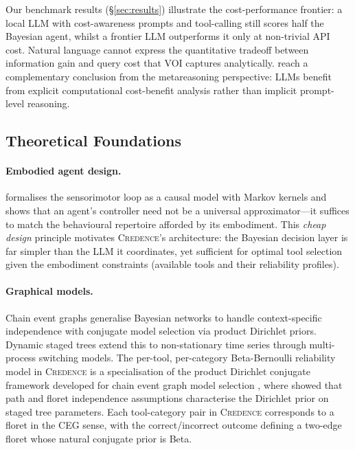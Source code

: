 \documentclass[11pt]{article}
\newcommand{\credence}{\textsc{Credence}}
\begin{document}
Our benchmark results (\S\ref{sec:results}) illustrate the cost-performance frontier: a local LLM with cost-awareness prompts and tool-calling still scores half the Bayesian agent, whilst a frontier LLM outperforms it only at non-trivial API cost. Natural language cannot express the quantitative tradeoff between information gain and query cost that VOI captures analytically. \citet{desabbata2024metareasoning} reach a complementary conclusion from the metareasoning perspective: LLMs benefit from explicit computational cost-benefit analysis rather than implicit prompt-level reasoning.

\subsection{Theoretical Foundations}

\paragraph{Embodied agent design.} \citet{ay2015geometric} formalises the sensorimotor loop as a causal model with Markov kernels and shows that an agent's controller need not be a universal approximator---it suffices to match the behavioural repertoire afforded by its embodiment. This \emph{cheap design} principle \citep{pfeifer2006body, montufar2015cheap} motivates \credence{}'s architecture: the Bayesian decision layer is far simpler than the LLM it coordinates, yet sufficient for optimal tool selection given the embodiment constraints (available tools and their reliability profiles).

\paragraph{Graphical models.} Chain event graphs \citep{smith2008chain, freeman2011bayesian, thwaites2009keod} generalise Bayesian networks to handle context-specific independence with conjugate model selection via product Dirichlet priors. Dynamic staged trees \citep{freeman2011dynamic} extend this to non-stationary time series through multi-process switching models. The per-tool, per-category Beta-Bernoulli reliability model in \credence{} is a specialisation of the product Dirichlet conjugate framework developed for chain event graph model selection \citep{freeman2011bayesian}, where \citet[Theorem~18]{freeman2011bayesian} showed that path and floret independence assumptions characterise the Dirichlet prior on staged tree parameters. Each tool-category pair in \credence{} corresponds to a floret in the CEG sense, with the correct/incorrect outcome defining a two-edge floret whose natural conjugate prior is Beta.
\end{document}
